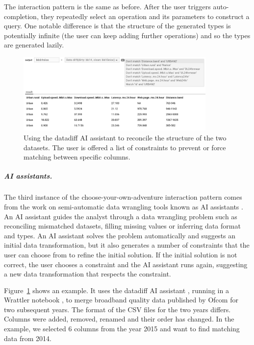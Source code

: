 \documentclass[anonymous, a4paper,UKenglish,cleveref, autoref, thm-restate]{lipics-v2021}
\begin{document}
The interaction pattern is the same as before. After the user triggers auto-completion, they
repeatedly select an operation and its parameters to construct a query. One notable difference
is that the structure of the generated types is potentially infinite (the user can keep adding
further operations) and so the types are generated lazily.

\begin{figure}[t]
  \vspace{-0.5em}
  \includegraphics[width=0.875\textwidth]{fig/aia.png}
  \caption{Using the datadiff AI assistant to reconcile the structure of the two datasets.
    The user is offered a list of constraints to prevent or force matching between specific columns.}
  \label{fig:aia}
\end{figure}


\subparagraph{AI assistants.}

The third instance of the choose-your-own-adventure interaction pattern comes from the work on
semi-automatic data wrangling tools known as AI assistants \cite{petricek-2023-aias}.
An AI assistant guides the analyst through a data wrangling problem such as reconciling mismatched
datasets, filling missing values or inferring data format and types. An AI assistant solves
the problem automatically and suggests an initial data transformation, but it also generates a
number of constraints that the user can choose from to refine the initial solution. If the initial
solution is not correct, the user chooses a constraint and the AI assistant runs again, suggesting
a new data transformation that respects the constraint.

Figure~\ref{fig:aia} shows an example. It uses the datadiff AI assistant \cite{sutton-2018-datadiff},
running in a Wrattler notebook \cite{petricek-2018-wrattler}, to merge broadband
quality data published by Ofcom for two subsequent years. The format of the CSV files for the
two years differs. Columns were added, removed, renamed and their order has changed. In the
example, we selected 6 columns from the year 2015 and want to find matching data from 2014.
\end{document}
